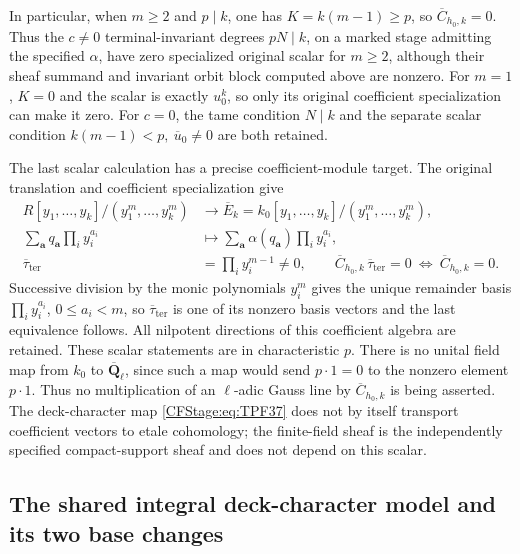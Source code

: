 In particular, when \(m\ge2\) and \(p\mid k\),
one has \(K=k(m-1)\ge p\), so
\(\overline C_{h_0,k}=0\). Thus the \(c\ne0\)
terminal-invariant degrees \(pN\mid k\), on
a marked stage admitting the specified
\(\alpha\), have zero specialized original
scalar for \(m\ge2\),
although their sheaf summand and invariant
orbit block computed above are nonzero.
For \(m=1\), \(K=0\) and the scalar is exactly
\(u_0^k\), so only its original coefficient
specialization can make it zero.
For \(c=0\), the tame condition \(N\mid k\)
and the separate scalar condition
\(k(m-1)<p,\ \overline u_0\ne0\) are both
retained.

The last scalar calculation has a precise
coefficient-module target. The original
translation and coefficient specialization give
\[
 \begin{split}
 R[y_1,\ldots,y_k]/(y_1^m,\ldots,y_k^m)
    &\longrightarrow
 \overline E_k
   =k_0[y_1,\ldots,y_k]/(y_1^m,\ldots,y_k^m),\\
 \sum_{\boldsymbol a}q_{\boldsymbol a}
                         \prod_i y_i^{a_i}
    &\longmapsto
       \sum_{\boldsymbol a}\alpha(q_{\boldsymbol a})
                         \prod_i y_i^{a_i},\\
 \overline\tau_{\mathrm{ter}}&=\prod_i y_i^{m-1}\ne0,\qquad
 \overline C_{h_0,k}\,\overline\tau_{\mathrm{ter}}=0
       \ \Longleftrightarrow\ \overline C_{h_0,k}=0 .
 \end{split}
 \tag{TPF.43}\label{CFStage:eq:TPF43}
\]
Successive division by the monic polynomials
\(y_i^m\) gives the unique remainder basis
\(\prod_i y_i^{a_i}\), \(0\le a_i<m\), so
\(\overline\tau_{\mathrm{ter}}\) is one of its nonzero basis
vectors and the last equivalence follows.
All nilpotent directions of this coefficient
algebra are retained. These scalar statements
are in characteristic \(p\). There is no
unital field map from \(k_0\) to
\(\overline{\mathbf Q}_\ell\), since such a
map would send \(p\cdot1=0\) to the nonzero
element \(p\cdot1\). Thus no multiplication
of an \(\ell\)-adic Gauss line by
\(\overline C_{h_0,k}\) is being asserted.
The deck-character map \eqref{CFStage:eq:TPF37}
does not by itself transport coefficient
vectors to etale cohomology; the
finite-field sheaf is the independently
specified compact-support sheaf and does
not depend on this scalar.

\subsection{The shared integral deck-character model and its two base changes}

